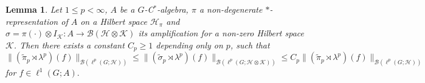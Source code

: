\documentclass[10pt,a4paper]{amsart}
\newtheorem{lem}{Lemma}
\newcommand{\mc}{\mathcal}
\begin{document}
\begin{lem}\label{lemma1}
Let $1\le p<\infty$, $A$ be a $G$-C$^*$-algebra, $\pi$ a non-degenerate $*$-representation of $A$ on a Hilbert space $\mc{H}_\pi$ and $\sigma=\pi(\cdot)\otimes I_{\mc{K}}\colon A\rightarrow \mc{B}(\mc{H}\otimes \mc{K})$ its amplification for a non-zero Hilbert space $\mc{K}$. Then there exists a constant $C_p\ge 1$ depending only on $p$, such that
\begin{equation}\label{eq3}
\|(\widetilde{\pi}_p\rtimes \lambda^p)(f)\|_{\mc{B}(\ell^p(G;\mc{H}))}\le
\|(\widetilde{\sigma}_p\rtimes \lambda^p)(f)\|_{\mc{B}(\ell^p(G;\mc{H}\otimes \mc{K}))}\le
C_p \|(\widetilde{\pi}_p\rtimes \lambda^p)(f)\|_{\mc{B}(\ell^p(G;\mc{H}))}
\end{equation}
for $f\in\ell^1(G;A).$
\end{lem}
\end{document}
